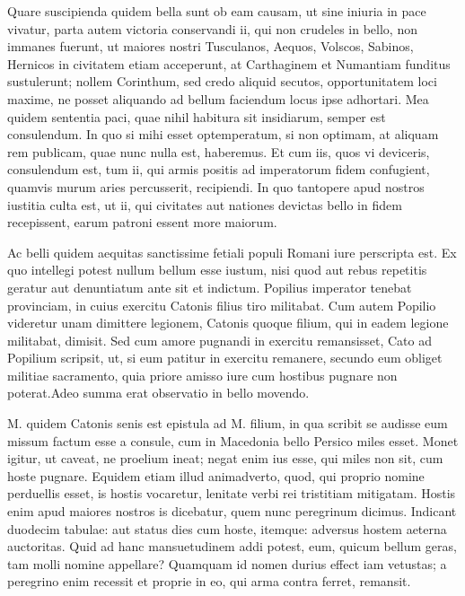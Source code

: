  Quare suscipienda quidem bella sunt ob eam causam, ut sine iniuria in pace vivatur, parta autem victoria conservandi ii, qui non crudeles in bello, non immanes fuerunt, ut maiores nostri Tusculanos, Aequos, Volscos, Sabinos, Hernicos in civitatem etiam acceperunt, at Carthaginem et Numantiam funditus sustulerunt; nollem Corinthum, sed credo aliquid secutos, opportunitatem loci maxime, ne posset aliquando ad bellum faciendum locus ipse adhortari. Mea quidem sententia paci, quae nihil habitura sit insidiarum, semper est consulendum. In quo si mihi esset optemperatum, si non optimam, at aliquam rem publicam, quae nunc nulla est, haberemus. Et cum iis, quos vi deviceris, consulendum est, tum ii, qui armis positis ad imperatorum fidem confugient, quamvis murum aries percusserit, recipiendi. In quo tantopere apud nostros iustitia culta est, ut ii, qui civitates aut nationes devictas bello in fidem recepissent, earum patroni essent more maiorum.

 Ac belli quidem aequitas sanctissime fetiali populi Romani iure perscripta est. Ex quo intellegi potest nullum bellum esse iustum, nisi quod aut rebus repetitis geratur aut denuntiatum ante sit et indictum. Popilius imperator tenebat provinciam, in cuius exercitu Catonis filius tiro militabat. Cum autem Popilio videretur unam dimittere legionem, Catonis quoque filium, qui in eadem legione militabat, dimisit. Sed cum amore pugnandi in exercitu remansisset, Cato ad Popilium scripsit, ut, si eum patitur in exercitu remanere, secundo eum obliget militiae sacramento, quia priore amisso iure cum hostibus pugnare non poterat.Adeo summa erat observatio in bello movendo.

 M. quidem Catonis senis est epistula ad M. filium, in qua scribit se audisse eum missum factum esse a consule, cum in Macedonia bello Persico miles esset. Monet igitur, ut caveat, ne proelium ineat; negat enim ius esse, qui miles non sit, cum hoste pugnare. Equidem etiam illud animadverto, quod, qui proprio nomine perduellis esset, is hostis vocaretur, lenitate verbi rei tristitiam mitigatam. Hostis enim apud maiores nostros is dicebatur, quem nunc peregrinum dicimus. Indicant duodecim tabulae: aut status dies cum hoste, itemque: adversus hostem aeterna auctoritas. Quid ad hanc mansuetudinem addi potest, eum, quicum bellum geras, tam molli nomine appellare? Quamquam id nomen durius effect iam vetustas; a peregrino enim recessit et proprie in eo, qui arma contra ferret, remansit.


